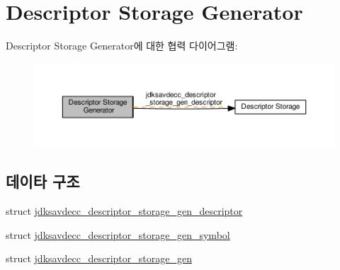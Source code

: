 \hypertarget{group__descriptor__storage__gen}{}\section{Descriptor Storage Generator}
\label{group__descriptor__storage__gen}
Descriptor Storage Generator에 대한 협력 다이어그램\+:
\nopagebreak
\begin{figure}[H]
\begin{center}
\leavevmode
\includegraphics[width=350pt]{group__descriptor__storage__gen}
\end{center}
\end{figure}
\subsection*{데이타 구조}
\begin{DoxyCompactItemize}
\item 
struct \hyperlink{structjdksavdecc__descriptor__storage__gen__descriptor}{jdksavdecc\+\_\+descriptor\+\_\+storage\+\_\+gen\+\_\+descriptor}
\item 
struct \hyperlink{structjdksavdecc__descriptor__storage__gen__symbol}{jdksavdecc\+\_\+descriptor\+\_\+storage\+\_\+gen\+\_\+symbol}
\item 
struct \hyperlink{structjdksavdecc__descriptor__storage__gen}{jdksavdecc\+\_\+descriptor\+\_\+storage\+\_\+gen}
\end{DoxyCompactItemize}
